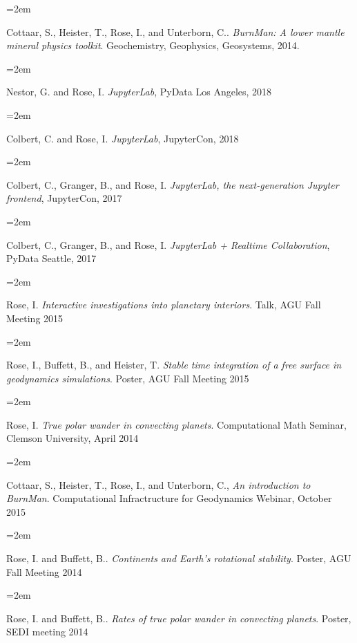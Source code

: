 \documentclass{scrartcl}
\newcommand{\Description}[1]{\hangindent=2em\hangafter=0\noindent\raggedright\footnotesize{#1}\par\normalsize\vspace{1em}} %
\begin{document}
\begin{cv}{\hspace{-4em} }

\Description{Cottaar, S., Heister, T., Rose, I., and Unterborn, C.. \textit{BurnMan: A lower mantle mineral physics toolkit}. Geochemistry, Geophysics, Geosystems, 2014.}


\vspace{1em} %



\noindent{}\vspace{1em}


\vspace{1em} %

\Description{Nestor, G. and Rose, I. \textit{JupyterLab}, PyData Los Angeles, 2018}
\Description{Colbert, C. and Rose, I. \textit{JupyterLab}, JupyterCon, 2018}
\Description{Colbert, C., Granger, B., and Rose, I. \textit{JupyterLab, the next-generation Jupyter frontend}, JupyterCon, 2017}
\Description{Colbert, C., Granger, B., and Rose, I. \textit{JupyterLab + Realtime Collaboration}, PyData Seattle, 2017}
\Description{Rose, I. \textit{Interactive investigations into planetary interiors}. Talk, AGU Fall Meeting 2015}
\Description{Rose, I., Buffett, B., and Heister, T. \textit{Stable time integration of a free surface in geodynamics simulations}. Poster, AGU Fall Meeting 2015}
\Description{Rose, I. \textit{True polar wander in convecting planets}. Computational Math Seminar, Clemson University, April 2014}
\Description{Cottaar, S., Heister, T., Rose, I., and Unterborn, C., \textit{An introduction to BurnMan}. Computational Infractructure for Geodynamics Webinar, October 2015}
\Description{Rose, I. and Buffett, B.. \textit{Continents and Earth's rotational stability}. Poster, AGU Fall Meeting 2014}
\Description{Rose, I. and Buffett, B.. \textit{Rates of true polar wander in convecting planets}. Poster, SEDI meeting 2014}



\date{}
\end{cv}
\end{document}
